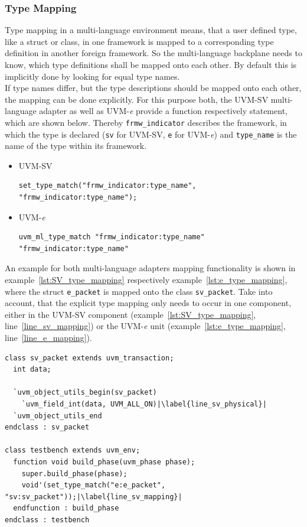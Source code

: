 \subsubsection{Type Mapping}
Type mapping in a multi-language environment means, that a user defined type, like a struct or class, in
one framework is mapped to a corresponding type definition in another foreign framework. So the multi-language
backplane needs to know, which type definitions shall be mapped onto each other. By default this is implicitly done by
looking for equal type names.\\
If type names differ, but the type descriptions should be mapped onto each other, the mapping can be done explicitly.
For this purpose both, the UVM-SV multi-language adapter as well as UVM-\textit{e} provide a function respectively
statement, which are shown below. Thereby \lstinline$frmw_indicator$ describes the framework, in which the type is
declared (\lstinline$sv$ for UVM-SV, \lstinline$e$ for UVM-\textit{e}) and \lstinline$type_name$ is the name
of the type within its framework.
\begin{itemize}
  \item{UVM-SV}
\begin{lstlisting}
set_type_match("frmw_indicator:type_name", "frmw_indicator:type_name");
\end{lstlisting} 
  \item{UVM-\textit{e}}
\begin{lstlisting}
uvm_ml_type_match "frmw_indicator:type_name" "frmw_indicator:type_name"
\end{lstlisting} 
\end{itemize}

An example for both multi-language adapters mapping functionality is shown in example~\ref{lst:SV_type_mapping}
respectively example~\ref{lst:e_type_mapping}, where the struct \lstinline$e_packet$ is mapped onto the class
\lstinline$sv_packet$. Take into account, that the explicit type mapping only needs to occur in one component, either in
the UVM-SV component (example~\ref{lst:SV_type_mapping}, line~\ref{line_sv_mapping}) or the
UVM-\textit{e} unit (example~\ref{lst:e_type_mapping}, line~\ref{line_e_mapping}).

\lstset{language=SystemVerilog, numbers = left, escapechar=|, breaklines=true}
\begin{lstlisting}[frame=htrbl, caption={SystemVerilog: mapping \lstinline$sv_packet$ onto \lstinline$e_packet$},
label={lst:SV_type_mapping}]
class sv_packet extends uvm_transaction;
  int data;
  
  `uvm_object_utils_begin(sv_packet)
    `uvm_field_int(data, UVM_ALL_ON)|\label{line_sv_physical}|
  `uvm_object_utils_end
endclass : sv_packet

class testbench extends uvm_env;
  function void build_phase(uvm_phase phase);
    super.build_phase(phase);
    void'(set_type_match("e:e_packet", "sv:sv_packet"));|\label{line_sv_mapping}|
  endfunction : build_phase
endclass : testbench
\end{lstlisting}

